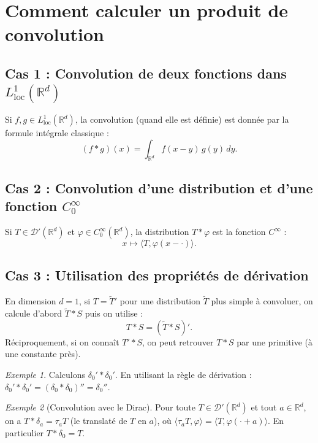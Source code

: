 \documentclass[12pt,a4paper,openany]{book}
\theoremstyle{definition}
\theoremstyle{plain}
\theoremstyle{remark}
\newtheorem*{example}{Exemple}
\newenvironment{exemple}{\begin{example}}{\end{example}}
\begin{document}
	\section{Comment calculer un produit de convolution}
	
	\subsection*{Cas 1 : Convolution de deux fonctions dans $L^1_{\mathrm{loc}}(\mathbb{R}^d)$}
	
	Si $f, g \in L^1_{\mathrm{loc}}(\mathbb{R}^d)$, la convolution (quand elle est définie) est donnée par la formule intégrale classique :
	\[
	(f * g)(x) = \int_{\mathbb{R}^d} f(x-y)\,g(y)\,dy.
	\]
	
	\subsection*{Cas 2 : Convolution d'une distribution et d'une fonction $C_0^\infty$}
	
	Si $T \in \mathcal{D}'(\mathbb{R}^d)$ et $\varphi \in C_0^\infty(\mathbb{R}^d)$, la distribution $T * \varphi$ est la fonction $C^\infty$ :
	\[
	x \longmapsto \langle T, \varphi(x - \cdot) \rangle.
	\]
	
	\subsection*{Cas 3 : Utilisation des propriétés de dérivation}
	
	En dimension $d = 1$, si $T = \tilde{T}'$ pour une distribution $\tilde{T}$ plus simple à convoluer, on calcule d'abord $\tilde{T} * S$ puis on utilise :
	\[
	T * S = (\tilde{T} * S)'.
	\]
	Réciproquement, si on connaît $T' * S$, on peut retrouver $T * S$ par une primitive (à une constante près).
	
	\begin{exemple}
		Calculons $\delta_0' * \delta_0'$. En utilisant la règle de dérivation : $\delta_0' * \delta_0' = (\delta_0 * \delta_0)'' = \delta_0'' $.
	\end{exemple}
	
	\begin{exemple}[Convolution avec le Dirac]
		Pour toute $T \in \mathcal{D}'(\mathbb{R}^d)$ et tout $a \in \mathbb{R}^d$, on a $T * \delta_a = \tau_a T$ (le translaté de $T$ en $a$), où $\langle \tau_a T, \varphi \rangle = \langle T, \varphi(\cdot + a) \rangle$. En particulier $T * \delta_0 = T$.
	\end{exemple}
	
\end{document}
